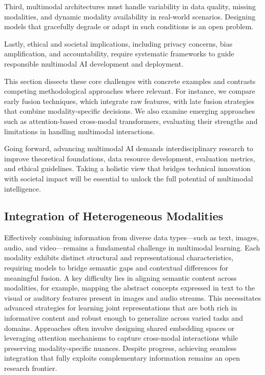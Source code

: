 \documentclass[sigconf]{acmart}
\begin{document}
Third, multimodal architectures must handle variability in data quality, missing modalities, and dynamic modality availability in real-world scenarios. Designing models that gracefully degrade or adapt in such conditions is an open problem.

Lastly, ethical and societal implications, including privacy concerns, bias amplification, and accountability, require systematic frameworks to guide responsible multimodal AI development and deployment.

This section dissects these core challenges with concrete examples and contrasts competing methodological approaches where relevant. For instance, we compare early fusion techniques, which integrate raw features, with late fusion strategies that combine modality-specific decisions. We also examine emerging approaches such as attention-based cross-modal transformers, evaluating their strengths and limitations in handling multimodal interactions.

Going forward, advancing multimodal AI demands interdisciplinary research to improve theoretical foundations, data resource development, evaluation metrics, and ethical guidelines. Taking a holistic view that bridges technical innovation with societal impact will be essential to unlock the full potential of multimodal intelligence.

\subsection{Integration of Heterogeneous Modalities}
Effectively combining information from diverse data types—such as text, images, audio, and video—remains a fundamental challenge in multimodal learning. Each modality exhibits distinct structural and representational characteristics, requiring models to bridge semantic gaps and contextual differences for meaningful fusion. A key difficulty lies in aligning semantic content across modalities, for example, mapping the abstract concepts expressed in text to the visual or auditory features present in images and audio streams. This necessitates advanced strategies for learning joint representations that are both rich in informative content and robust enough to generalize across varied tasks and domains. Approaches often involve designing shared embedding spaces or leveraging attention mechanisms to capture cross-modal interactions while preserving modality-specific nuances. Despite progress, achieving seamless integration that fully exploits complementary information remains an open research frontier.
\end{document}
